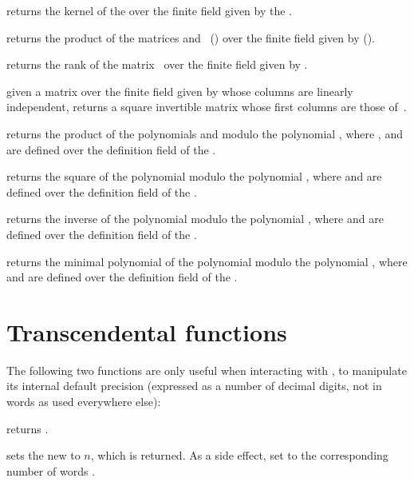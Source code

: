  returns the kernel of the 
 over the finite field given by the  .

 returns the product of the
matrices  and~ () over the finite field given
by  ().

 returns the rank of the
matrix~ over the finite field given by .

 given a matrix  over the
finite field given by  whose columns are linearly independent,
returns a square invertible matrix whose first columns are those
of~.


 returns the product
of the polynomials  and  modulo the polynomial , where
,  and  are defined over the definition field of the
 .

 returns the square
of the polynomial  modulo the polynomial , where  and
 are defined over the definition field of the  .

 returns the inverse
of the polynomial  modulo the polynomial , where  and
 are defined over the definition field of the  .

 returns the minimal
polynomial of the polynomial  modulo the polynomial , where
 and  are defined over the definition field of the 
.

\section{Transcendental functions}

The following two functions are only useful when interacting with ,
to manipulate its internal default precision (expressed as a number of
decimal digits, not in words as used everywhere else):

 returns .

 sets the new
 to $n$, which is returned. As a side effect, set
 to the corresponding number of words .

